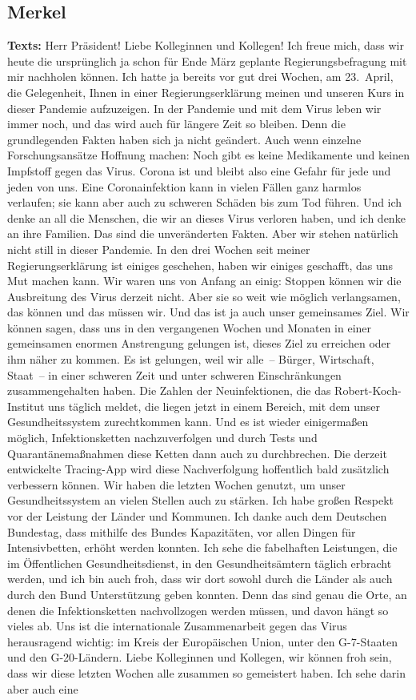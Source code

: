 \documentclass{article}
\begin{document}
\subsection{Merkel}
\noindent\textbf{Texts:} Herr Präsident! Liebe Kolleginnen und Kollegen! Ich freue mich, dass wir heute die ursprünglich ja schon für Ende März geplante Regierungsbefragung mit mir nachholen können. Ich hatte ja bereits vor gut drei Wochen, am 23. April, die Gelegenheit, Ihnen in einer Regierungserklärung meinen und unseren Kurs in dieser Pandemie aufzuzeigen. In der Pandemie und mit dem Virus leben wir immer noch, und das wird auch für längere Zeit so bleiben. Denn die grundlegenden Fakten haben sich ja nicht geändert. Auch wenn einzelne Forschungsansätze Hoffnung machen: Noch gibt es keine Medikamente und keinen Impfstoff gegen das Virus. Corona ist und bleibt also eine Gefahr für jede und jeden von uns. Eine Coronainfektion kann in vielen Fällen ganz harmlos verlaufen; sie kann aber auch zu schweren Schäden bis zum Tod führen. Und ich denke an all die Menschen, die wir an dieses Virus verloren haben, und ich denke an ihre Familien. Das sind die unveränderten Fakten. Aber wir stehen natürlich nicht still in dieser Pandemie. In den drei Wochen seit meiner Regierungserklärung ist einiges geschehen, haben wir einiges geschafft, das uns Mut machen kann. Wir waren uns von Anfang an einig: Stoppen können wir die Ausbreitung des Virus derzeit nicht. Aber sie so weit wie möglich verlangsamen, das können und das müssen wir. Und das ist ja auch unser gemeinsames Ziel. Wir können sagen, dass uns in den vergangenen Wochen und Monaten in einer gemeinsamen enormen Anstrengung gelungen ist, dieses Ziel zu erreichen oder ihm näher zu kommen. Es ist gelungen, weil wir alle – Bürger, Wirtschaft, Staat – in einer schweren Zeit und unter schweren Einschränkungen zusammengehalten haben. Die Zahlen der Neuinfektionen, die das Robert-Koch-Institut uns täglich meldet, die liegen jetzt in einem Bereich, mit dem unser Gesundheitssystem zurechtkommen kann. Und es ist wieder einigermaßen möglich, Infektionsketten nachzuverfolgen und durch Tests und Quarantänemaßnahmen diese Ketten dann auch zu durchbrechen. Die derzeit entwickelte Tracing-App wird diese Nachverfolgung hoffentlich bald zusätzlich verbessern können. Wir haben die letzten Wochen genutzt, um unser Gesundheitssystem an vielen Stellen auch zu stärken. Ich habe großen Respekt vor der Leistung der Länder und Kommunen. Ich danke auch dem Deutschen Bundestag, dass mithilfe des Bundes Kapazitäten, vor allen Dingen für Intensivbetten, erhöht werden konnten. Ich sehe die fabelhaften Leistungen, die im Öffentlichen Gesundheitsdienst, in den Gesundheitsämtern täglich erbracht werden, und ich bin auch froh, dass wir dort sowohl durch die Länder als auch durch den Bund Unterstützung geben konnten. Denn das sind genau die Orte, an denen die Infektionsketten nachvollzogen werden müssen, und davon hängt so vieles ab. Uns ist die internationale Zusammenarbeit gegen das Virus herausragend wichtig: im Kreis der Europäischen Union, unter den G-7-Staaten und den G-20-Ländern. Liebe Kolleginnen und Kollegen, wir können froh sein, dass wir diese letzten Wochen alle zusammen so gemeistert haben. Ich sehe darin aber auch eine 
\end{document}

